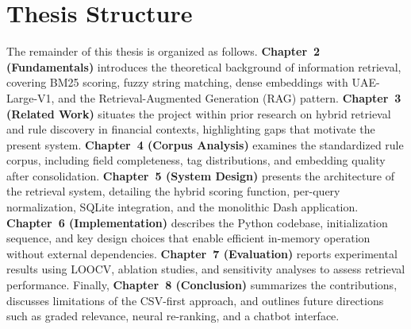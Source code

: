 \section{Thesis Structure}
The remainder of this thesis is organized as follows. \textbf{Chapter~2 (Fundamentals)} introduces the theoretical background of information retrieval, covering BM25 scoring, fuzzy string matching, dense embeddings with UAE-Large-V1, and the Retrieval-Augmented Generation (RAG) pattern. \textbf{Chapter~3 (Related Work)} situates the project within prior research on hybrid retrieval and rule discovery in financial contexts, highlighting gaps that motivate the present system. \textbf{Chapter~4 (Corpus Analysis)} examines the standardized rule corpus, including field completeness, tag distributions, and embedding quality after consolidation. \textbf{Chapter~5 (System Design)} presents the architecture of the retrieval system, detailing the hybrid scoring function, per-query normalization, SQLite integration, and the monolithic Dash application. \textbf{Chapter~6 (Implementation)} describes the Python codebase, initialization sequence, and key design choices that enable efficient in-memory operation without external dependencies. \textbf{Chapter~7 (Evaluation)} reports experimental results using LOOCV, ablation studies, and sensitivity analyses to assess retrieval performance. Finally, \textbf{Chapter~8 (Conclusion)} summarizes the contributions, discusses limitations of the CSV-first approach, and outlines future directions such as graded relevance, neural re-ranking, and a chatbot interface.